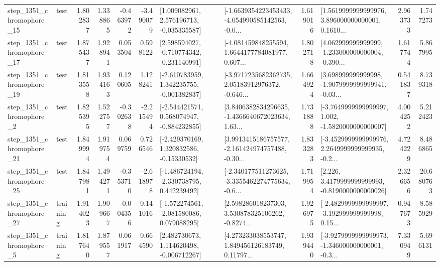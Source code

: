 \begin{tabular}{llrrrrllrlrr}
 step\_1351\_chromophore\_15 &      test &      1.802837 &    1.338865 &     -0.463972 & -3.490079 &    [1.009082961, 2.576196713, -0.035335587] &  [-1.6639354223453433, -4.054990585142563, -0.0... &       1.619016 &  [1.5619999999999976, 3.896000000000001, 0.1610... &            2.963733 &          1.747273 \\
 step\_1351\_chromophore\_17 &      test &      1.875437 &    1.928941 &      0.053504 &  0.598122 &   [2.598594027, -0.710774342, -0.231140991] &  [-4.081459848255594, 1.6644177784081977, 0.607... &       1.802718 &  [4.062999999999999, -1.233000000000004, -0.390... &            1.617744 &          5.867995 \\
 step\_1351\_chromophore\_19 &      test &      1.813558 &    1.934163 &      0.120605 &  1.128241 &   [-2.610783959, 1.342235755, -0.001382837] &  [-3.9717235682362735, 2.05183912976372, -0.646... &       1.664924 &  [3.698999999999998, -1.9079999999999941, -0.03... &            0.541837 &          8.739318 \\
  step\_1351\_chromophore\_2 &      test &      1.825395 &    1.522757 &     -0.302638 & -2.215494 &   [-2.544421571, 0.568074947, -0.884232855] &  [3.8406382834296635, -1.4366640672023634, 1.63... &       1.731888 &  [-3.7649999999999997, 1.002, -1.5820000000000007] &            4.004252 &          5.212423 \\
 step\_1351\_chromophore\_21 &      test &      1.849994 &    1.919754 &      0.069759 &  0.726546 &    [-2.429370169, 1.320832586, -0.15330532] &  [3.9913415186757577, -2.161424974757488, -0.30... &       1.833283 &  [-3.4529999999999976, 2.2649999999999935, -0.2... &            4.724229 &          8.486865 \\
 step\_1351\_chromophore\_25 &      test &      1.847981 &    1.494271 &     -0.353710 & -2.618978 &   [-1.486724194, -2.330738795, 0.442239492] &  [-2.340177511273625, -3.3355462274775634, -0.6... &       1.719954 &   [2.226, 3.4179999999999993, -0.8190000000000026] &            2.326656 &         20.680763 \\
 step\_1351\_chromophore\_27 &  training &      1.914023 &    1.909667 &     -0.004356 &  0.141016 &   [-1.572274561, -2.081580086, 0.079088295] &  [2.598286018237303, 3.530878325106262, -0.8274... &       1.926975 &  [-2.4829999999999997, -3.192999999999998, 0.15... &            0.947673 &          8.585929 \\
  step\_1351\_chromophore\_5 &  training &      1.817640 &    1.879557 &      0.061917 &  0.664590 &    [2.482730673, 1.114620498, -0.006712267] &  [4.273233038553747, 1.849456126183749, 0.11797... &       1.939440 &  [-3.9279999999999973, -1.346000000000001, -0.3... &            7.330949 &          5.696131 \\

\end{tabular}
